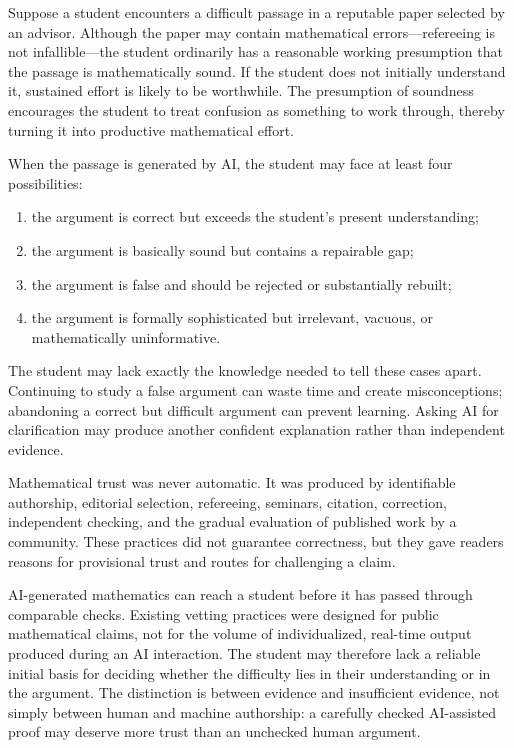 \documentclass[11pt]{article}
\begin{document}
Suppose a student encounters a difficult passage in a reputable paper selected by an
advisor.  Although the paper may contain mathematical errors---refereeing is not
infallible---the student ordinarily has a reasonable working presumption that the passage
is mathematically sound.  If the student does not initially understand it, sustained
effort is likely to be worthwhile.  The presumption of soundness encourages the student
to treat confusion as something to work through, thereby turning it into productive
mathematical effort.

When the passage is generated by AI, the student may face at least four possibilities:

\begin{enumerate}
    \item the argument is correct but exceeds the student's present understanding;
    \item the argument is basically sound but contains a repairable gap;
    \item the argument is false and should be rejected or substantially rebuilt;
    \item the argument is formally sophisticated but irrelevant, vacuous, or
    mathematically uninformative.
\end{enumerate}

The student may lack exactly the knowledge needed to tell these cases apart.  Continuing
to study a false argument can waste time and create misconceptions; abandoning a correct
but difficult argument can prevent learning.  Asking AI for clarification may produce
another confident explanation rather than independent evidence.

Mathematical trust was never automatic.  It was produced by identifiable authorship,
editorial selection, refereeing, seminars, citation, correction, independent checking,
and the gradual evaluation of published work by a community.  These practices did not
guarantee correctness, but they gave readers reasons for provisional trust and routes for
challenging a claim.

AI-generated mathematics can reach a student before it has passed through comparable
checks. Existing vetting practices were designed for public mathematical claims, not for
the volume of individualized, real-time output produced during an AI interaction. The
student may therefore lack a reliable initial basis for deciding whether the difficulty
lies in their understanding or in the argument. The distinction is between evidence
and insufficient evidence, not simply between human and machine authorship: a carefully
checked AI-assisted proof may deserve more trust than an unchecked human argument.
\end{document}
